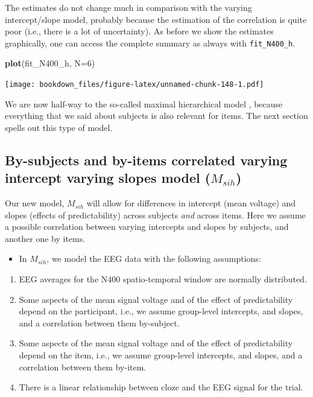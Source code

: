 \documentclass[12pt,]{krantz}
\newenvironment{Shaded}{\begin{snugshade}}{\end{snugshade}}
\newcommand{\DataTypeTok}[1]{\textcolor[rgb]{0.13,0.29,0.53}{#1}}
\newcommand{\DecValTok}[1]{\textcolor[rgb]{0.00,0.00,0.81}{#1}}
\newcommand{\KeywordTok}[1]{\textcolor[rgb]{0.13,0.29,0.53}{\textbf{#1}}}
\newcommand{\NormalTok}[1]{#1}
\providecommand{\tightlist}{%
  \setlength{\itemsep}{0pt}\setlength{\parskip}{0pt}}
\theoremstyle{definition}
\theoremstyle{definition}
\theoremstyle{definition}
\theoremstyle{remark}
\begin{document}
The estimates do not change much in comparison with the varying intercept/slope model, probably because the estimation of the correlation is quite poor (i.e., there is a lot of uncertainty). As before we show the estimates graphically, one can access the complete summary as always with \texttt{fit\_N400\_h}.

\begin{Shaded}
\begin{Highlighting}[]
\KeywordTok{plot}\NormalTok{(fit_N400_h, }\DataTypeTok{N=}\DecValTok{6}\NormalTok{)}
\end{Highlighting}
\end{Shaded}

\texttt{[image: bookdown\_files/figure-latex/unnamed-chunk-148-1.pdf]}

We are now half-way to the so-called maximal hierarchical model \citep{barr2013}, because everything that we said about subjects is also relevant for items. The next section spells out this type of model.

\hypertarget{sec:sih}{%
\subsection{\texorpdfstring{By-subjects and by-items correlated varying intercept varying slopes model (\(M_{sih}\))}{By-subjects and by-items correlated varying intercept varying slopes model (M\_\{sih\})}}\label{sec:sih}}

Our new model, \(M_{sih}\) will allow for differences in intercept (mean voltage) and slopes (effects of predictability) across subjects \emph{and} across items. Here
we assume a possible correlation between varying intercepts and slopes by subjects, and another one by items.

\begin{itemize}
\tightlist
\item
  In \(M_{sih}\), we model the EEG data with the following assumptions:
\end{itemize}

\begin{enumerate}
\def\labelenumi{\arabic{enumi}.}
\tightlist
\item
  EEG averages for the N400 spatio-temporal window are normally distributed.
\item
  Some aspects of the mean signal voltage and of the effect of predictability depend on the participant, i.e., we assume group-level intercepts, and slopes, and a correlation between them by-subject.
\item
  Some aspects of the mean signal voltage and of the effect of predictability depend on the item, i.e., we assume group-level intercepts, and slopes, and a correlation between them by-item.
\item
  There is a linear relationship between cloze and the EEG signal for the trial.
\end{enumerate}
\end{document}
